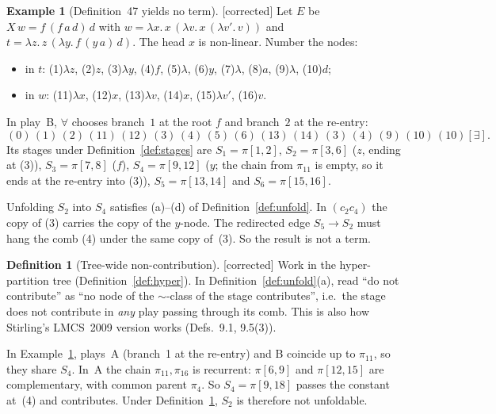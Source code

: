 \documentclass[11pt]{article}
\newcommand{\iv}[2]{\pi[#1,#2]}
\newcommand{\Fixed}{\textsf{[corrected]}}
\theoremstyle{plain}
\theoremstyle{definition}
\newtheorem{definition}[theorem]{Definition}
\newtheorem{example}[theorem]{Example}
\theoremstyle{remark}
\begin{document}
\begin{example}[Definition~47 yields no term]\label{ex:obstruction}
\Fixed{} Let $E$ be $X\,w=f\,(f\,a\,d)\,d$ with
$w=\lambda x.\,x\,(\lambda v.\,x\,(\lambda v'.\,v))$ and
$t=\lambda z.\,z\,(\lambda y.\,f\,(y\,a)\,d)$.  The head $x$ is
non-linear.  Number the nodes:
\begin{itemize}
\item in $t$: (1)$\lambda z$, (2)$z$, (3)$\lambda y$, (4)$f$, (5)$\lambda$,
  (6)$y$, (7)$\lambda$, (8)$a$, (9)$\lambda$, (10)$d$;
\item in $w$: (11)$\lambda x$, (12)$x$, (13)$\lambda v$, (14)$x$,
  (15)$\lambda v'$, (16)$v$.
\end{itemize}
In play~B, $\forall$ chooses branch~$1$ at the root $f$ and branch~$2$
at the re-entry:
\[
(0)\,(1)\,(2)\,(11)\,(12)\,(3)\,(4)\,(5)\,(6)\,(13)\,(14)\,(3)\,(4)\,(9)\,(10)\,(10)[\exists].
\]
Its stages under Definition~\ref{def:stages} are
$S_1=\iv12$, $S_2=\iv36$ ($z$, ending at (3)), $S_3=\iv78$ ($f$),
$S_4=\iv9{12}$ ($y$; the chain from $\pi_{11}$ is empty, so it ends at
the re-entry into (3)), $S_5=\iv{13}{14}$ and $S_6=\iv{15}{16}$.

Unfolding $S_2$ into $S_4$ satisfies (a)--(d) of
Definition~\ref{def:unfold}.  In $(c_2c_4)$ the copy of (3) carries the
copy of the $y$-node.  The redirected edge $S_5\to S_2$ must hang the
comb (4) under the same copy of~(3).  So the result is not a term.
\end{example}

\begin{definition}[Tree-wide non-contribution]\label{def:47a}
\Fixed{} Work in the hyper-partition tree (Definition~\ref{def:hyper}).
In Definition~\ref{def:unfold}(a), read ``do not contribute'' as ``no
node of the $\sim$-class of the stage contributes'', i.e.\ the stage
does not contribute in \emph{any} play passing through its comb.  This is
also how Stirling's LMCS~2009 version works (Defs.~9.1, 9.5(3)).
\end{definition}

In Example~\ref{ex:obstruction}, plays~A (branch~1 at the re-entry) and
B coincide up to $\pi_{11}$, so they share $S_4$.  In~A the chain
$\pi_{11},\pi_{16}$ is recurrent: $\iv69$ and $\iv{12}{15}$ are
complementary, with common parent $\pi_4$.  So $S_4=\iv9{18}$ passes
the constant at~(4) and contributes.  Under Definition~\ref{def:47a},
$S_2$ is therefore not unfoldable.
\end{document}
